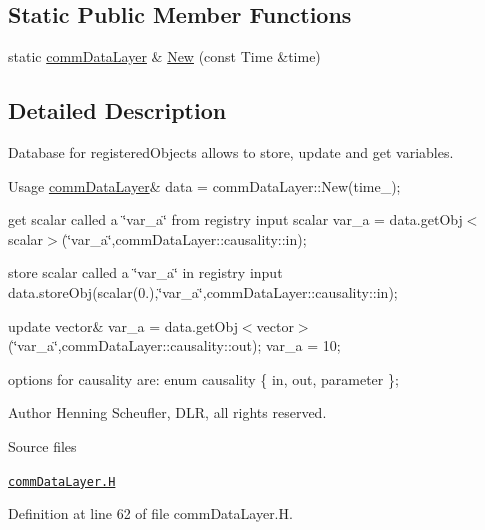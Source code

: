 \subsection*{Static Public Member Functions}
\begin{DoxyCompactItemize}
\item 
static \hyperlink{classFoam_1_1commDataLayer}{comm\+Data\+Layer} \& \hyperlink{classFoam_1_1commDataLayer_afba2bff8d4fa91c093e6f93ee18272dd}{New} (const Time \&time)
\end{DoxyCompactItemize}


\subsection{Detailed Description}
Database for registered\+Objects allows to store, update and get variables. 

\label{_Description}%
 \begin{DoxyParagraph}{Usage}
\hyperlink{classFoam_1_1commDataLayer}{comm\+Data\+Layer}\& data = comm\+Data\+Layer\+::\+New(time\+\_\+);
\end{DoxyParagraph}
get scalar called a \char`\"{}var\+\_\+a\char`\"{} from registry input scalar var\+\_\+a = data.\+get\+Obj$<$scalar$>$(\char`\"{}var\+\_\+a\char`\"{},comm\+Data\+Layer\+::causality\+::in);

store scalar called a \char`\"{}var\+\_\+a\char`\"{} in registry input data.\+store\+Obj(scalar(0.),\char`\"{}var\+\_\+a\char`\"{},comm\+Data\+Layer\+::causality\+::in);

update vector\& var\+\_\+a = data.\+get\+Obj$<$vector$>$(\char`\"{}var\+\_\+a\char`\"{},comm\+Data\+Layer\+::causality\+::out); var\+\_\+a = 10;

options for causality are\+: enum causality \{ in, out, parameter \};

Author Henning Scheufler, D\+LR, all rights reserved.

\begin{DoxyParagraph}{Source files}

\begin{DoxyItemize}
\item \href{../../../home/carlo/data/GeN-Foam/GeN-Foam_ffn/GeN-Foam/GeN-Foam/FMU4FOAM/ECI4FOAM/src/externalComm/dataInterface/commDataLayer.H}{\tt comm\+Data\+Layer.\+H} 
\end{DoxyItemize}
\end{DoxyParagraph}


Definition at line 62 of file comm\+Data\+Layer.\+H.




